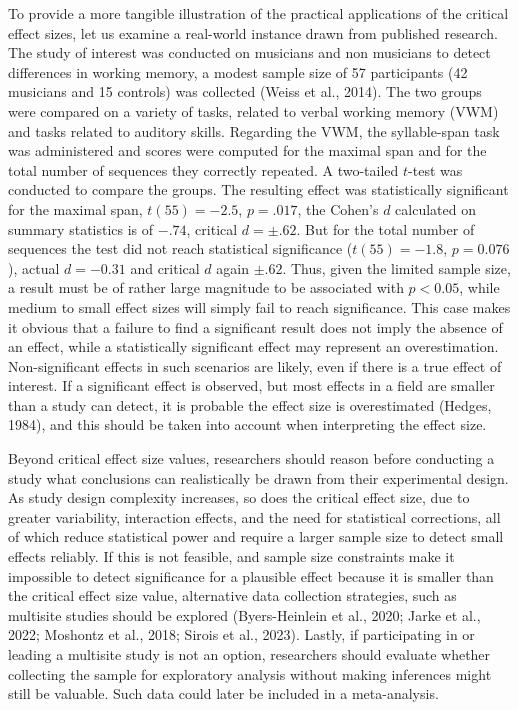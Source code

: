 \documentclass[
  man,floatsintext]{apa7}
\begin{document}
To provide a more tangible illustration of the practical applications of the critical effect sizes, let us examine a real-world instance drawn from published research. The study of interest was conducted on musicians and non musicians to detect differences in working memory, a modest sample size of 57 participants (42 musicians and 15 controls) was collected (Weiss et al., 2014). The two groups were compared on a variety of tasks, related to verbal working memory (VWM) and tasks related to auditory skills. Regarding the VWM, the syllable-span task was administered and scores were computed for the maximal span and for the total number of sequences they correctly repeated. A two-tailed \(t\)-test was conducted to compare the groups. The resulting effect was statistically significant for the maximal span, \(t(55) = -2.5\), \(p = .017\), the Cohen's \(d\) calculated on summary statistics is of \(-.74\), critical \(d = \pm .62\). But for the total number of sequences the test did not reach statistical significance (\(t(55) = -1.8\), \(p = 0.076\)), actual \(d = -0.31\) and critical \(d\) again \(\pm.62\). Thus, given the limited sample size, a result must be of rather large magnitude to be associated with \(p < 0.05\), while medium to small effect sizes will simply fail to reach significance. This case makes it obvious that a failure to find a significant result does not imply the absence of an effect, while a statistically significant effect may represent an overestimation. Non-significant effects in such scenarios are likely, even if there is a true effect of interest. If a significant effect is observed, but most effects in a field are smaller than a study can detect, it is probable the effect size is overestimated (Hedges, 1984), and this should be taken into account when interpreting the effect size.

Beyond critical effect size values, researchers should reason before conducting a study what conclusions can realistically be drawn from their experimental design. As study design complexity increases, so does the critical effect size, due to greater variability, interaction effects, and the need for statistical corrections, all of which reduce statistical power and require a larger sample size to detect small effects reliably. If this is not feasible, and sample size constraints make it impossible to detect significance for a plausible effect because it is smaller than the critical effect size value, alternative data collection strategies, such as multisite studies should be explored (Byers-Heinlein et al., 2020; Jarke et al., 2022; Moshontz et al., 2018; Sirois et al., 2023). Lastly, if participating in or leading a multisite study is not an option, researchers should evaluate whether collecting the sample for exploratory analysis without making inferences might still be valuable. Such data could later be included in a meta-analysis.
\end{document}
